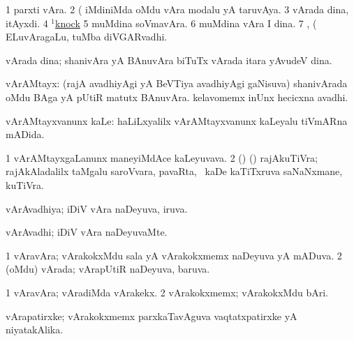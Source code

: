 \noindent 
\gl{\pagu}
\expl{}
\bmng
\bnum
\num{1}  parxti vAra. 
\num{2}  (  iMdiniMda oMdu vAra modalu yA taruvAya. 
\num{3}  vArada dina, \udA\  itAyxdi. 
\num{4} \hyperref{kandict_k.pdf}{K}{knock(1) nuga(3)}{$^1$knock}  
\num{5}  muMdina soVmavAra. 
\num{6}  muMdina vAra I dina. 
\num{7} , (  ELuvAragaLu, tuMba diVGARvadhi. 
\enum
\emng
\eentry

\bentry
{} 
\gl{\nA}
\expl{}
\bmng
vArada dina; shanivAra yA BAnuvAra biTuTx vArada itara yAvudeV dina. 
\emng
\eentry

\bentry
{} 
\gl{\nA}
\expl{}
\bmng
vArAMtayx: 
\banum
{} (rajA avadhiyAgi yA BeVTiya avadhiyAgi gaNisuva) shanivArada oMdu BAga yA pUtiR matutx BAnuvAra. 
 kelavomemx inUnx hecicxna avadhi. 
\eanum
\emng
\eentry

\bentry
{} 
\gl{\akirx}
\expl{}
\bmng
vArAMtayxvanunx kaLe:  haLiLxyalilx vArAMtayxvanunx kaLeyalu tiVmARna mADida. 
\emng
\eentry

\bentry
{} 
\gl{\nA}
\expl{}
\bmng
\bnum
\num{1} vArAMtayxgaLanunx maneyiMdAce kaLeyuvava. 
\num{2} (\AseTxrXV) (\AmA) rajAkuTiVra; rajAkAladalilx taMgalu saroVvara, pavaRta, \mo\ kaDe kaTiTxruva saNaNxmane, kuTiVra. 
\enum
\emng
\eentry

\bentry
{} 
\gl{\gu}
\expl{}
\bmng
vArAvadhiya; iDiV vAra naDeyuva, iruva. 
\emng
\eentry

\bentry
{} 
\gl{\kirxvi}
\expl{}
\bmng
vArAvadhi; iDiV vAra naDeyuvaMte. 
\emng
\eentry

\bentry
{} 
\gl{\gu}
\expl{}
\bmng
\bnum
\num{1} vAravAra; vArakokxMdu sala yA vArakokxmemx naDeyuva yA mADuva. 
\num{2} (oMdu) vArada; vArapUtiR naDeyuva, baruva. 
\enum
\emng
\eentry

\bentry
{} 
\gl{\kirxvi}
\expl{}
\bmng
\bnum
\num{1} vAravAra; vAradiMda vArakekx. 
\num{2} vArakokxmemx; vArakokxMdu bAri. 
\enum
\emng
\eentry

\bentry
{} 
\gl{\nA}
\bmng
vArapatirxke; vArakokxmemx parxkaTavAguva vaqtatxpatirxke yA niyatakAlika. 
\emng
\eentry

